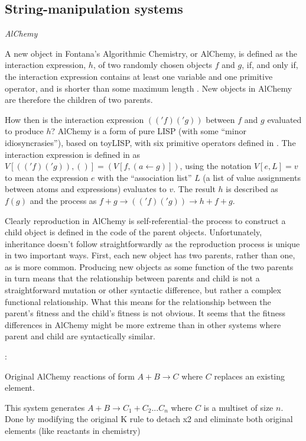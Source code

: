 \begin{NOTES}
\subsection{String-manipulation systems}
\emph{AlChemy} \cite{Fontana1992}

A new object in Fontana's Algorithmic Chemistry, or AlChemy, is defined as the interaction expression, $h$, of two randomly chosen objects $f$ and $g$, if, and only if, the interaction expression contains at least one variable and one primitive operator, and is shorter than some maximum length \parencite[p.173--p.180]{Fontana1992}. New objects in AlChemy are therefore the children of two parents.

How then is the interaction expression $(('f)('g))$ between $f$ and $g$ evaluated to produce $h$? AlChemy is a form of pure LISP (with some ``minor idiosyncrasies''), based on toyLISP, with six primitive operators defined in \cite[p.205]{Fontana1992}. The interaction expression is defined in \cite[Definition A.9, p.204]{Fontana1992} as $V[(('f)('g)),()] = (V[f,(a\leftarrow g)])$, using the notation $V[e,L]=v$ to mean the expression $e$ with the ``association list'' $L$ (a list of value assignments between atoms and expressions) evaluates to $v$. The result $h$ is described as $f(g)$ and the process as $f+g \rightarrow (('f)('g)) \rightarrow h + f + g$.

Clearly reproduction in AlChemy is self-referential--the process to construct a child object is defined in the code of the parent objects. Unfortunately, inheritance doesn't follow straightforwardly as the reproduction process is unique in two important ways. First, each new object has two parents, rather than one, as is more common. Producing new objects as some function of the two parents in turn means that the relationship between parents and child is not a straightforward mutation or other syntactic difference, but rather a complex functional relationship. What this means for the relationship between the parent's fitness and the child's fitness is not obvious. It seems that the fitness differences in AlChemy might be more extreme than in other systems where parent and child are syntactically similar.

\parencite{Fenizio2000}:

Original AlChemy reactions of form $A+B\rightarrow C$ where $C$ replaces an existing element.

This system generates $A+B\rightarrow C_1+C_2...C_n$ where $C$ is a multiset of size $n$. Done by modifying the original K rule to detach x2 and eliminate both original elements (like reactants in chemistry)


\end{NOTES}

